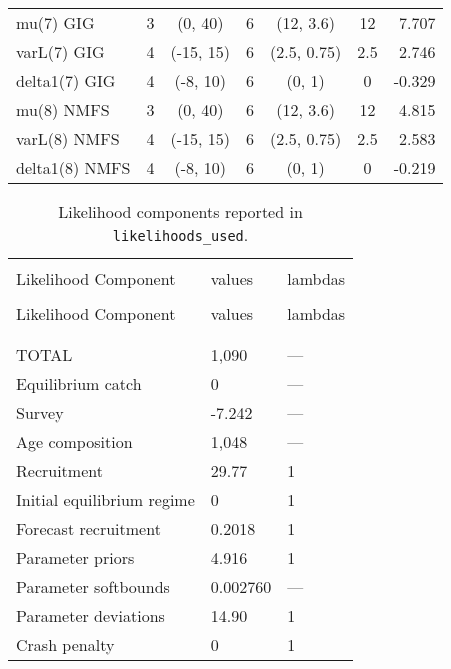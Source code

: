 \begin{table}[!h]
\begin{tabular}{lcccccr}
mu(7) GIG & 3 & (0, 40) & 6 & (12, 3.6) & 12 & 7.707 \\
varL(7) GIG & 4 & (-15, 15) & 6 & (2.5, 0.75) & 2.5 & 2.746 \\
delta1(7) GIG & 4 & (-8, 10) & 6 & (0, 1) & 0 & -0.329 \\
mu(8) NMFS & 3 & (0, 40) & 6 & (12, 3.6) & 12 & 4.815 \\
varL(8) NMFS & 4 & (-15, 15) & 6 & (2.5, 0.75) & 2.5 & 2.583 \\
delta1(8) NMFS & 4 & (-8, 10) & 6 & (0, 1) & 0 & -0.219 \\
\hline
\end{tabular}
\usefont{\encodingdefault}{\familydefault}{\seriesdefault}{\shapedefault}\normalsize
\end{table}

\clearpage

\setlength{\tabcolsep}{0pt}
\begin{longtable}[c]{>{\raggedright\let\newline\\\arraybackslash\hspace{0pt}}p{2.31in}>{\raggedleft\let\newline\\\arraybackslash\hspace{0pt}}p{1.35in}>{\raggedleft\let\newline\\\arraybackslash\hspace{0pt}}p{1.35in}}
  \caption{Likelihood components reported in \texttt{likelihoods\_used}.} \label{tab:like1}\\  \hline\\[-2.2ex]  
  Likelihood Component  & values & lambdas \\[0.2ex]\hline\\[-1.5ex]  \endfirsthead   \hline  
  Likelihood Component  & values & lambdas \\[0.2ex]\hline\\[-1.5ex]  \endhead  \hline\\[-2.2ex]   \endfoot  \hline \endlastfoot
  TOTAL & 1,090 & --- \\ 
  Equilibrium catch & 0 & --- \\ 
  Survey & -7.242 & --- \\ 
  Age composition & 1,048 & --- \\ 
  Recruitment & 29.77 & 1 \\ 
  Initial equilibrium regime & 0 & 1 \\ 
  Forecast recruitment & 0.2018 & 1 \\ 
  Parameter priors & 4.916 & 1 \\ 
  Parameter softbounds & 0.002760 & --- \\ 
  Parameter deviations & 14.90 & 1 \\ 
  Crash penalty & 0 & 1 \\ 
\end{longtable}\setlength{\tabcolsep}{0pt}

